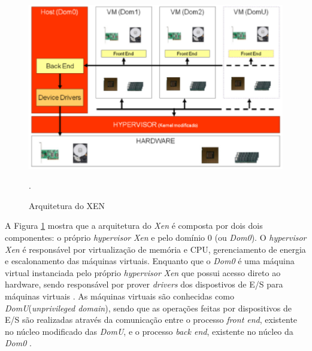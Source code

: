 \begin{figure}[!htb]
\centering
\includegraphics [keepaspectratio=true,scale=0.65]{figuras/xen_arquitecture.eps}
\caption{Arquitetura do XEN}
\cite{fabiano}.
\label{xen_arquitecture}
\end{figure}

A Figura \ref{xen_arquitecture} mostra que a arquitetura do \textit{Xen} é composta por dois dois componentes: o próprio \textit{hypervisor} \textit{Xen} e pelo domínio 0 (ou \textit{Dom0}). O \textit{hypervisor} \textit{Xen} é responsável por virtualização de memória e CPU, gerenciamento de energia e escalonamento das máquinas virtuais. Enquanto que o \textit{Dom0} é uma máquina virtual instanciada pelo próprio \textit{hypervisor} \textit{Xen} que possui acesso direto ao hardware, sendo responsável por prover \textit{drivers} dos dispostivos de E/S para máquinas virtuais \cite{redhatkvm}. As máquinas virtuais são conhecidas como \textit{DomU}(\textit{unprivileged domain}), sendo que as operações feitas por dispositivos de E/S são realizadas através da comunicação entre o processo \textit{front end}, existente no núcleo modificado das \textit{DomU}, e o processo \textit{back end}, existente no núcleo da \textit{Dom0} \cite{redhatkvm}.




